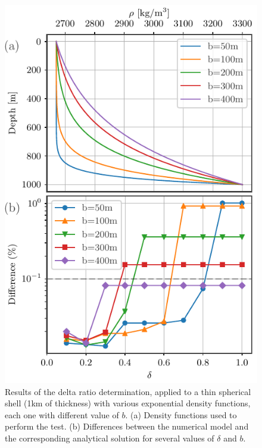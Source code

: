 \documentclass[extra]{gji}
\begin{document}
\begin{figure}
\centering
\includegraphics[width=0.9\linewidth]{figures/exponential-delta-thin.pdf}
\caption{
    Results of the delta ratio determination, applied to a thin spherical shell (1km of thickness) with various exponential density functions, each one with different value of $b$.
    (a) Density functions used to perform the test.
    (b) Differences between the numerical model and the corresponding analytical solution for several values of $\delta$ and $b$.}
\label{fig:exponential-delta-thin}
\end{figure}
\end{document}
